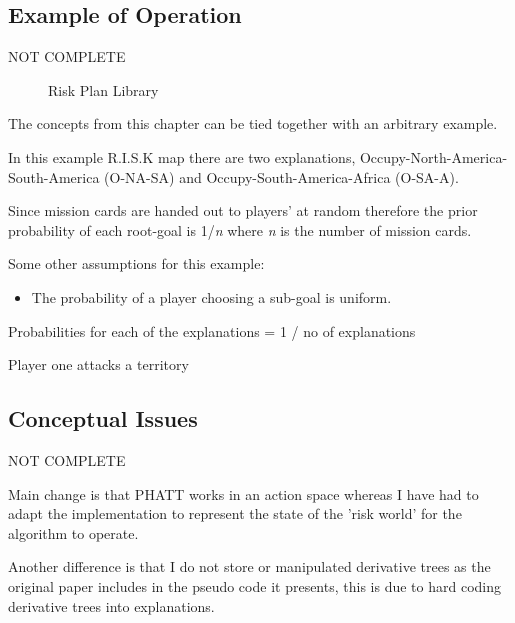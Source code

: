 \documentclass[parskip]{cs4rep}
\begin{document}
\subsection{Example of Operation}

NOT COMPLETE
\begin{figure}[h]
\caption{Risk Plan Library}
\end{figure}
The concepts from this chapter can be tied together with an arbitrary example.

In this example R.I.S.K map there are two explanations, Occupy-North-America-South-America (O-NA-SA) and Occupy-South-America-Africa (O-SA-A). 

Since mission cards are handed out to players' at random therefore the prior probability of each root-goal is 1/\textit{n} where \textit{n} is the number of mission cards. 

Some other assumptions for this example:

\begin{itemize}
\item
The probability of a player choosing a sub-goal is uniform.
\end{itemize}

Probabilities for each of the explanations = 1 / no of explanations

Player one attacks a territory 

\subsection{Conceptual Issues}

NOT COMPLETE

Main change is that PHATT works in an action space whereas I have had to adapt the implementation to represent the state of the 'risk world' for the algorithm to operate.

Another difference is that I do not store or manipulated derivative trees as the original paper includes in the pseudo code it presents, this is due to hard coding derivative trees into explanations.
\end{document}
